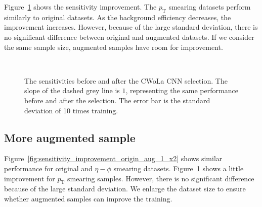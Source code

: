\documentclass[12pt]{article}
\begin{document}
        Figure~\ref{fig:sensitivity_improvement_origin_pt_aug_1} shows the sensitivity improvement. The $p_{\text{T}}$ smearing datasets perform similarly to original datasets. As the background efficiency decreases, the improvement increases. However, because of the large standard deviation, there is no significant difference between original and augmented datasets. If we consider the same sample size, augmented samples have room for improvement.
        \begin{figure}[htpb]
            \centering
             \\
            \caption{The sensitivities before and after the CWoLa CNN selection. The slope of the dashed grey line is $1$, representing the same performance before and after the selection. The error bar is the standard deviation of 10 times training.}
            \label{fig:sensitivity_improvement_origin_pt_aug_1}
        \end{figure}
    \subsection{More augmented sample}%
    \label{sub:more_augmented_sample}
        Figure~\ref{fig:sensitivity_improvement_origin_aug_1_x2} shows similar performance for original and $\eta-\phi$ smearing datasets. Figure~\ref{fig:sensitivity_improvement_origin_pt_aug_1} shows a little improvement for $p_{\text{T}}$ smearing samples. However, there is no significant difference because of the large standard deviation. We enlarge the dataset size to ensure whether augmented samples can improve the training.
\end{document}
